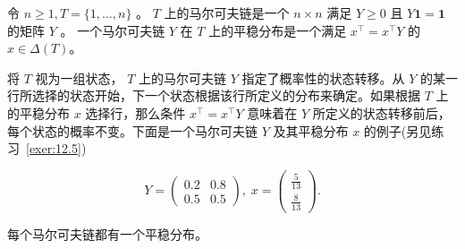 \begin{definition}\label{def:12.8}
令 \(n \geq  1, T = \{ 1,\ldots ,n\}\) 。 \(T\) 上的马尔可夫链是一个 \(n \times  n\) 满足 \(Y \geq  0\) 且 \(Y\bm{1} = \bm{1}\) 的矩阵 \(Y\) 。 一个马尔可夫链 \(Y\) 在 \(T\) 上的平稳分布是一个满足 \({x}^{\top } = {x}^{\top }Y\) 的 \(x \in \Delta (T)\)。
\end{definition}

将 \(T\) 视为一组状态， \(T\) 上的马尔可夫链 \(Y\) 指定了概率性的状态转移。从 \(Y\) 的某一行所选择的状态开始，下一个状态根据该行所定义的分布来确定。如果根据 \(T\) 上的平稳分布 \(x\) 选择行，那么条件 \({x}^{\top } = {x}^{\top }Y\) 意味着在 \(Y\) 所定义的状态转移前后，每个状态的概率不变。下面是一个马尔可夫链 \(Y\) 及其平稳分布 \(x\) 的例子(另见练习~\ref{exer:12.5})

\[
Y = \left( \begin{array}{ll} {0.2} & {0.8} \\  {0.5} & {0.5} \end{array}\right) ,\;x = \left( \begin{matrix} \frac{5}{13} \\  \frac{8}{13} \end{matrix}\right) .
\]

\begin{theorem}\label{theo:12.9}
每个马尔可夫链都有一个平稳分布。
\end{theorem}

